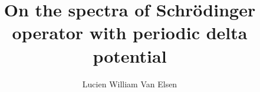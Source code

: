 
\title{On the spectra of Schrödinger operator with periodic delta potential}

\author{Lucien William Van Elsen}
%
%
%
%
%

\maketitle


